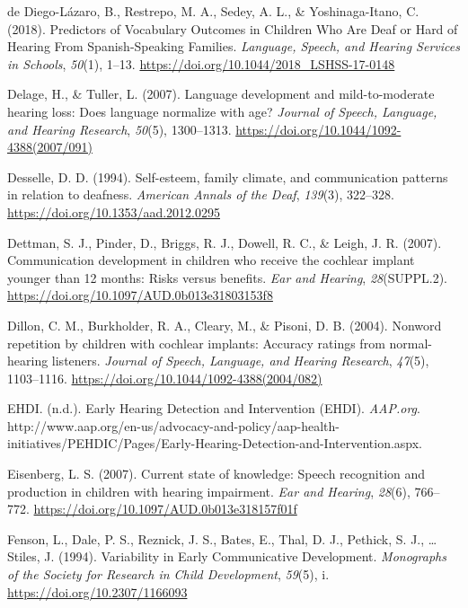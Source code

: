 \documentclass[english,man]{apa6}
\begin{document}
\leavevmode\hypertarget{ref-dediego-lazaro2018}{}%
de Diego-Lázaro, B., Restrepo, M. A., Sedey, A. L., \& Yoshinaga-Itano, C. (2018). Predictors of Vocabulary Outcomes in Children Who Are Deaf or Hard of Hearing From Spanish-Speaking Families. \emph{Language, Speech, and Hearing Services in Schools}, \emph{50}(1), 1--13. \url{https://doi.org/10.1044/2018_LSHSS-17-0148}

\leavevmode\hypertarget{ref-delage2007}{}%
Delage, H., \& Tuller, L. (2007). Language development and mild-to-moderate hearing loss: Does language normalize with age? \emph{Journal of Speech, Language, and Hearing Research}, \emph{50}(5), 1300--1313. \url{https://doi.org/10.1044/1092-4388(2007/091)}

\leavevmode\hypertarget{ref-desselle1994}{}%
Desselle, D. D. (1994). Self-esteem, family climate, and communication patterns in relation to deafness. \emph{American Annals of the Deaf}, \emph{139}(3), 322--328. \url{https://doi.org/10.1353/aad.2012.0295}

\leavevmode\hypertarget{ref-dettman2007}{}%
Dettman, S. J., Pinder, D., Briggs, R. J., Dowell, R. C., \& Leigh, J. R. (2007). Communication development in children who receive the cochlear implant younger than 12 months: Risks versus benefits. \emph{Ear and Hearing}, \emph{28}(SUPPL.2). \url{https://doi.org/10.1097/AUD.0b013e31803153f8}

\leavevmode\hypertarget{ref-dillon2004}{}%
Dillon, C. M., Burkholder, R. A., Cleary, M., \& Pisoni, D. B. (2004). Nonword repetition by children with cochlear implants: Accuracy ratings from normal-hearing listeners. \emph{Journal of Speech, Language, and Hearing Research}, \emph{47}(5), 1103--1116. \url{https://doi.org/10.1044/1092-4388(2004/082)}

\leavevmode\hypertarget{ref-ehdi}{}%
EHDI. (n.d.). Early Hearing Detection and Intervention (EHDI). \emph{AAP.org}. http://www.aap.org/en-us/advocacy-and-policy/aap-health-initiatives/PEHDIC/Pages/Early-Hearing-Detection-and-Intervention.aspx.

\leavevmode\hypertarget{ref-eisenberg2007}{}%
Eisenberg, L. S. (2007). Current state of knowledge: Speech recognition and production in children with hearing impairment. \emph{Ear and Hearing}, \emph{28}(6), 766--772. \url{https://doi.org/10.1097/AUD.0b013e318157f01f}

\leavevmode\hypertarget{ref-fenson1994}{}%
Fenson, L., Dale, P. S., Reznick, J. S., Bates, E., Thal, D. J., Pethick, S. J., \ldots{} Stiles, J. (1994). Variability in Early Communicative Development. \emph{Monographs of the Society for Research in Child Development}, \emph{59}(5), i. \url{https://doi.org/10.2307/1166093}
\end{document}
